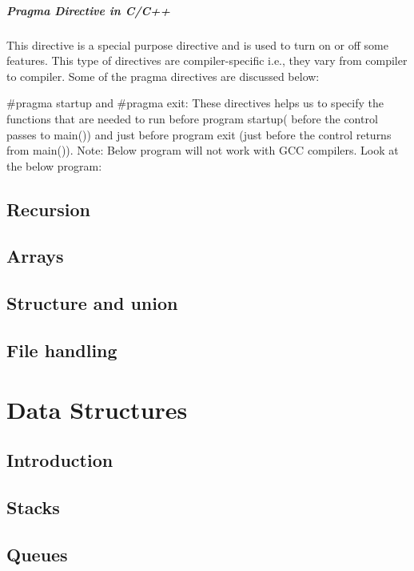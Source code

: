 \documentclass[12pt, a4paper]{article}
\begin{document}
    \paragraph{Pragma Directive in C/C++}
    This directive is a special purpose directive and is used to turn on or off some features. This type of directives are compiler-specific i.e., they vary from compiler to compiler. Some of the pragma directives are discussed below:
    
    \#pragma startup and \#pragma exit: These directives helps us to specify the functions that are needed to run before program startup( before the control passes to main()) and just before program exit (just before the control returns from main()).
    Note: Below program will not work with GCC compilers.
    Look at the below program:
    

    \iffalse
    \section{Recursion}
    \section{Arrays}
    \section{Structure and union}
    \section{File handling}


    \chapter{Data Structures}    
    \section{Introduction}
    \section{Stacks}
    \section{Queues}
\end{document}
